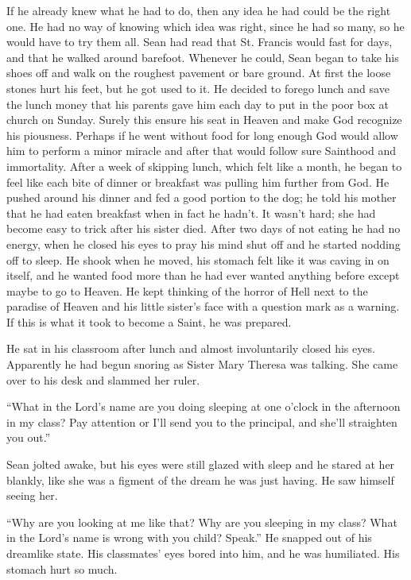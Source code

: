 \documentclass[12pt]{article}
\begin{document}
If he already knew what he had to do, then any idea he had could be the right one. He had no way of knowing which idea was right, since he had so many, so he would have to try them all. Sean had read that St. Francis would fast for days, and that he walked around barefoot.  Whenever he could, Sean began to take his shoes off and walk on the roughest pavement or bare ground. At first the loose stones hurt his feet, but he got used to it. He decided to forego lunch and save the lunch money that his parents gave him each day to put in the poor box at church on Sunday. Surely this ensure his seat in Heaven and make God recognize his piousness. Perhaps if he went without food for long enough God would allow him to perform a minor miracle and after that would follow sure Sainthood and immortality. After a week of skipping lunch, which felt like a month, he began to feel like each bite of dinner or breakfast was pulling him further from God. He pushed around his dinner and fed a good portion to the dog; he told his mother that he had eaten breakfast when in fact he hadn’t. It wasn’t hard; she had become easy to trick after his sister died. After two days of not eating he had no energy, when he closed his eyes to pray his mind shut off and he started nodding off to sleep. He shook when he moved, his stomach felt like it was caving in on itself, and he wanted food more than he had ever wanted anything before except maybe to go to Heaven. He kept thinking of the horror of Hell next to the paradise of Heaven and his little sister’s face with a question mark as a warning. If this is what it took to become a Saint, he was prepared.

He sat in his classroom after lunch and almost involuntarily closed his eyes. 
Apparently he had begun snoring as Sister Mary Theresa was talking.  
She came over to his desk and slammed her ruler.

“What in the Lord’s name are you doing sleeping at one o’clock in the afternoon in my class?
Pay attention or I’ll send you to the principal, and she’ll straighten you out.”

Sean jolted awake, but his eyes were still glazed with sleep and he stared at her blankly, like she was a figment of the dream he was just having.  
He saw himself seeing her.

“Why are you looking at me like that? Why are you sleeping in my class? What in the Lord’s name is wrong with you child? Speak.” He snapped out of his dreamlike state. His classmates’ eyes bored into him, and he was humiliated. His stomach hurt so much.
\end{document}
